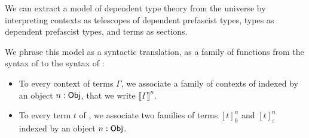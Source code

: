 We can extract a model of dependent type theory from the universe 
by interpreting contexts as telescopes of dependent prefascist types, types as 
dependent prefascist types, and terms as sections.

We phrase this model as a syntactic translation, \ie as a family of functions
from the syntax of \MLTT to the syntax of \SetoidCCplus:
% 
\begin{itemize}
\item To every context of \MLTT terms \( \Gamma \), we associate a family of contexts of \SetoidCCplus
    indexed by an object \( n : \func{Obj} \), that we write \( \llbracket Γ \rrbracket^n \).
\item To every term \( t \) of \MLTT, we associate two families of terms
    \( {[t]}^n_0 \) and \( {[t]}^n_ε \) indexed by an object \( n : \func{Obj} \).
\end{itemize}


